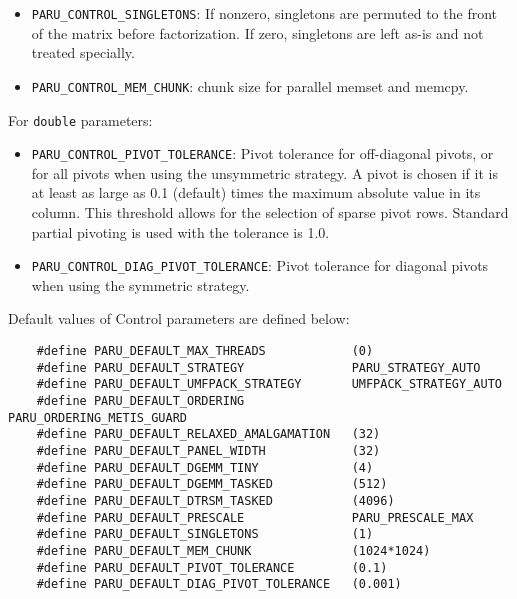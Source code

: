 \documentclass[12pt]{article}
\begin{document}
\begin{itemize}
    \item \verb'PARU_CONTROL_SINGLETONS': %
        If nonzero, singletons are permuted to the front of the matrix before
        factorization.  If zero, singletons are left as-is and not treated
        specially.

    \item \verb'PARU_CONTROL_MEM_CHUNK': %
        chunk size for parallel memset and memcpy.
    \end{itemize}

    For \verb'double' parameters:

    \begin{itemize}
    \item \verb'PARU_CONTROL_PIVOT_TOLERANCE': %
        Pivot tolerance for off-diagonal pivots, or for all pivots when using
        the unsymmetric strategy.  A pivot is chosen if it is at least as large
        as 0.1 (default) times the maximum absolute value in its column.  This
        threshold allows for the selection of sparse pivot rows.  Standard
        partial pivoting is used with the tolerance is 1.0.

    \item \verb'PARU_CONTROL_DIAG_PIVOT_TOLERANCE': %
        Pivot tolerance for diagonal pivots when using the symmetric strategy.

    \end{itemize}

Default values of Control parameters are defined below:

    {\footnotesize
    \begin{verbatim}
    #define PARU_DEFAULT_MAX_THREADS            (0)
    #define PARU_DEFAULT_STRATEGY               PARU_STRATEGY_AUTO
    #define PARU_DEFAULT_UMFPACK_STRATEGY       UMFPACK_STRATEGY_AUTO
    #define PARU_DEFAULT_ORDERING               PARU_ORDERING_METIS_GUARD
    #define PARU_DEFAULT_RELAXED_AMALGAMATION   (32)
    #define PARU_DEFAULT_PANEL_WIDTH            (32)
    #define PARU_DEFAULT_DGEMM_TINY             (4)
    #define PARU_DEFAULT_DGEMM_TASKED           (512)
    #define PARU_DEFAULT_DTRSM_TASKED           (4096)
    #define PARU_DEFAULT_PRESCALE               PARU_PRESCALE_MAX
    #define PARU_DEFAULT_SINGLETONS             (1)
    #define PARU_DEFAULT_MEM_CHUNK              (1024*1024)
    #define PARU_DEFAULT_PIVOT_TOLERANCE        (0.1)
    #define PARU_DEFAULT_DIAG_PIVOT_TOLERANCE   (0.001) \end{verbatim}}
\end{document}
